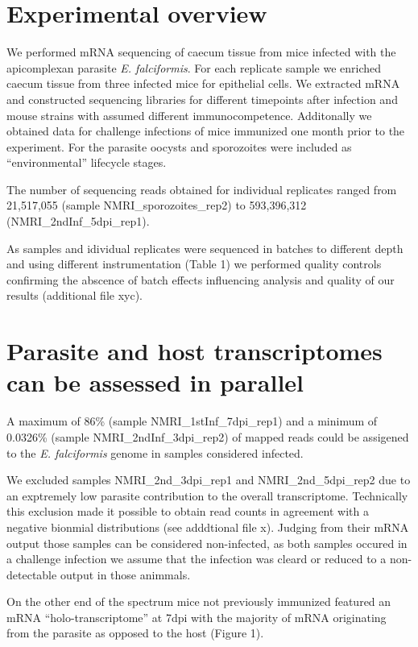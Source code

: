 \documentclass{bmcart}
\begin{document}
  \section*{Experimental overview}
We performed mRNA sequencing of caecum tissue from mice infected with
the apicomplexan parasite \textit{E. falciformis}. For each replicate
sample we enriched caecum tissue from three infected mice for
epithelial cells. We extracted mRNA and constructed sequencing
libraries for different timepoints after infection and mouse strains
with assumed different immunocompetence.
Additonally we obtained data for challenge infections of mice
immunized one month prior to the experiment. For the parasite oocysts
and sporozoites were included as ``environmental'' lifecycle stages.

The number of sequencing reads obtained for individual replicates
ranged from 21,517,055 (sample NMRI\_sporozoites\_rep2) to 593,396,312
(NMRI\_2ndInf\_5dpi\_rep1).

As samples and idividual replicates were sequenced in batches to
different depth and using different instrumentation (Table 1) we
performed quality controls confirming the abscence of batch effects
influencing analysis and quality of our results (additional file xyc).

\section*{Parasite and host transcriptomes can be assessed in parallel}

A maximum of 86\% (sample NMRI\_1stInf\_7dpi\_rep1) and a minimum of
0.0326\% (sample NMRI\_2ndInf\_3dpi\_rep2) of mapped reads could be
assigened to the \textit{E. falciformis} genome in samples considered
infected.

We excluded samples NMRI\_2nd\_3dpi\_rep1 and NMRI\_2nd\_5dpi\_rep2
due to an exptremely low parasite contribution to the overall
transcriptome. Technically this exclusion made it possible to obtain
read counts in agreement with a negative bionmial distributions (see
adddtional file x). Judging from their mRNA output those samples can
be considered non-infected, as both samples occured in a challenge
infection we assume that the infection was cleard or reduced to a
non-detectable output in those animmals.

On the other end of the spectrum mice not previously immunized
featured an mRNA ``holo-transcriptome'' at 7dpi with the majority of
mRNA originating from the parasite as opposed to the host (Figure 1).
\end{document}
